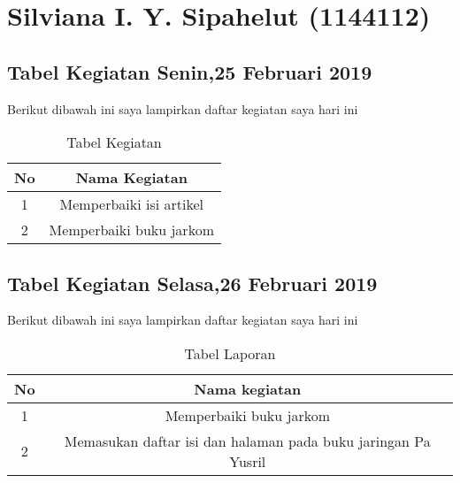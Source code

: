 \chapter{Silviana I. Y. Sipahelut (1144112)}
\section{Tabel Kegiatan Senin,25 Februari 2019}
Berikut dibawah ini saya lampirkan daftar kegiatan saya hari ini
\begin{table}[h]
\caption{Tabel Kegiatan}
\centering
\begin{tabular}{|c|c|}
\hline
No&Nama Kegiatan\\
\hline
1&Memperbaiki isi artikel\\
\hline
2&Memperbaiki buku jarkom\\
\hline
\end{tabular}
\label{table:Laporan kegiatan}
\end{table}

\section{Tabel Kegiatan Selasa,26 Februari 2019}
Berikut dibawah ini saya lampirkan daftar kegiatan saya hari ini
\begin{table}[h]
\caption{Tabel Laporan}
\centering
\begin{tabular}{|c|c|}
\hline
No&Nama kegiatan\\
\hline
1&Memperbaiki buku jarkom\\
\hline
2&Memasukan daftar isi dan halaman pada buku jaringan Pa Yusril\\
\hline
\end{tabular}
\label{table:Laporan kegiatan}
\end{table}